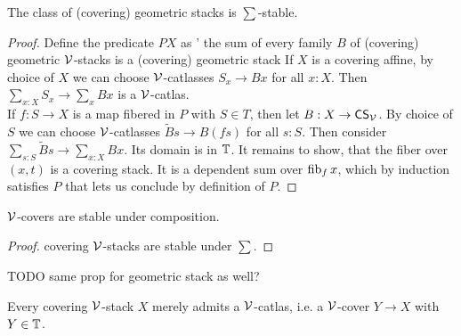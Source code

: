 \documentclass{article}
\newcommand{\CS}{\mathsf{CS}}
\begin{document}
\begin{lemma}
	The class of (covering) geometric stacks is $\sum$-stable.
\end{lemma}
\begin{proof}
	Define the predicate $P X$ as ' the sum of every family $B$ of (covering) geometric $\mathcal{V}$-stacks is a (covering) geometric stack
	If $X$ is a covering affine, by choice of $X$ we can choose $\mathcal{V}$-catlasses $S_x \to B x$ for all $x : X$. Then $\sum_{x :X } S_x \to \sum_x B x$ is a $\mathcal{V}$-catlas. \\
	If $f : S \to X$ is a map fibered in $P$ with $S \in T$, then let $B : X \to \CS_\cV$. By choice of $S$ we can choose $\mathcal{V}$-catlasses $\tilde B s \to B (f s)$ for all $s : S$. Then consider $\sum_{s : S} \tilde B s \to \sum_{x : X} B x$. Its domain is in $\mathbb{T}$. It remains to show, that the fiber over $(x,t)$ is a covering stack. It is a dependent sum over $\operatorname{fib}_f x$, which by induction satisfies $P$ that lets us conclude by definition of $P$.
\end{proof}
\begin{lemma}{\label{lemma:coversstableundercomp}}
	$\mathcal{V}$-covers are stable under composition.
\end{lemma}
\begin{proof}
	covering $\mathcal{V}$-stacks are stable under $\sum$.
\end{proof}
TODO same prop for geometric stack as well?
\begin{prop}{\label{prop:csHasAtlas}}
	Every covering $\mathcal{V}$-stack $X$ merely admits a $\mathcal{V}$-catlas, i.e. a $\mathcal{V}$-cover $Y \to X$ with $Y \in \mathbb{T}$. 
\end{prop}
\end{document}
